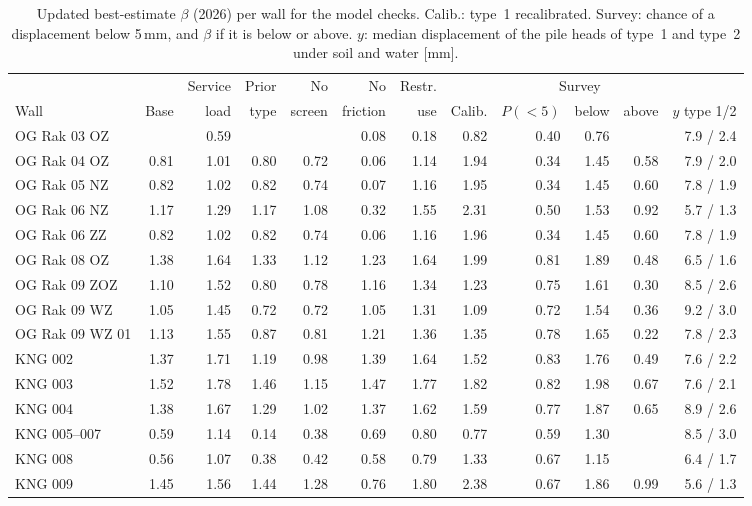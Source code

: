 \begin{table}[htbp]
\centering
\footnotesize
\caption{Updated best-estimate $\beta$ (2026) per wall for the model checks.
Calib.: type~1 recalibrated. Survey: chance of a displacement below 5\,mm, and
$\beta$ if it is below or above. $y$: median displacement of the pile heads of
type~1 and type~2 under soil and water [mm].}
\label{tab:model-checks}
\setlength{\tabcolsep}{3.1pt}
\begin{tabular}{@{}l r r r r r r r r r r r@{}}
\toprule
 & & Service & Prior & No & No & Restr. & & \multicolumn{3}{c}{Survey} & \\
\cmidrule(lr){9-11}
Wall & Base & load & type & screen & friction & use & Calib. & $P(<5)$ & below & above & $y$ type 1/2 \\
\midrule
OG Rak 03 OZ    & \textminus0.06 & 0.59 & \textminus0.31 & \textminus0.16 & 0.08 & 0.18 & 0.82 & 0.40 & 0.76 & \textminus0.61 & 7.9 / 2.4 \\
OG Rak 04 OZ    & 0.81 & 1.01 & 0.80 & 0.72 & 0.06 & 1.14 & 1.94 & 0.34 & 1.45 & 0.58 & 7.9 / 2.0 \\
OG Rak 05 NZ    & 0.82 & 1.02 & 0.82 & 0.74 & 0.07 & 1.16 & 1.95 & 0.34 & 1.45 & 0.60 & 7.8 / 1.9 \\
OG Rak 06 NZ    & 1.17 & 1.29 & 1.17 & 1.08 & 0.32 & 1.55 & 2.31 & 0.50 & 1.53 & 0.92 & 5.7 / 1.3 \\
OG Rak 06 ZZ    & 0.82 & 1.02 & 0.82 & 0.74 & 0.06 & 1.16 & 1.96 & 0.34 & 1.45 & 0.60 & 7.8 / 1.9 \\
OG Rak 08 OZ    & 1.38 & 1.64 & 1.33 & 1.12 & 1.23 & 1.64 & 1.99 & 0.81 & 1.89 & 0.48 & 6.5 / 1.6 \\
OG Rak 09 ZOZ   & 1.10 & 1.52 & 0.80 & 0.78 & 1.16 & 1.34 & 1.23 & 0.75 & 1.61 & 0.30 & 8.5 / 2.6 \\
OG Rak 09 WZ    & 1.05 & 1.45 & 0.72 & 0.72 & 1.05 & 1.31 & 1.09 & 0.72 & 1.54 & 0.36 & 9.2 / 3.0 \\
OG Rak 09 WZ 01 & 1.13 & 1.55 & 0.87 & 0.81 & 1.21 & 1.36 & 1.35 & 0.78 & 1.65 & 0.22 & 7.8 / 2.3 \\
KNG 002         & 1.37 & 1.71 & 1.19 & 0.98 & 1.39 & 1.64 & 1.52 & 0.83 & 1.76 & 0.49 & 7.6 / 2.2 \\
KNG 003         & 1.52 & 1.78 & 1.46 & 1.15 & 1.47 & 1.77 & 1.82 & 0.82 & 1.98 & 0.67 & 7.6 / 2.1 \\
KNG 004         & 1.38 & 1.67 & 1.29 & 1.02 & 1.37 & 1.62 & 1.59 & 0.77 & 1.87 & 0.65 & 8.9 / 2.6 \\
KNG 005--007    & 0.59 & 1.14 & 0.14 & 0.38 & 0.69 & 0.80 & 0.77 & 0.59 & 1.30 & \textminus0.11 & 8.5 / 3.0 \\
KNG 008         & 0.56 & 1.07 & 0.38 & 0.42 & 0.58 & 0.79 & 1.33 & 0.67 & 1.15 & \textminus0.31 & 6.4 / 1.7 \\
KNG 009         & 1.45 & 1.56 & 1.44 & 1.28 & 0.76 & 1.80 & 2.38 & 0.67 & 1.86 & 0.99 & 5.6 / 1.3 \\
\bottomrule
\end{tabular}
\end{table}

